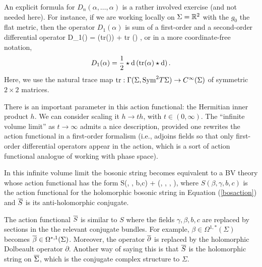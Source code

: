 An explicit formula for $D_n(\alpha,\ldots,\alpha)$ is a rather involved exercise (and not needed here).
For instance, if we are working locally on $\Sigma = \RR^2$ with the $g_0$ the flat metric, 
then the operator $D_1(\alpha)$ is sum of a first-order and a second-order differential operator
\ben
D_1(\alpha) =   ({\rm tr}(\alpha))  +  {\rm tr} (\alpha)  , 
\een
or in a more coordinate-free notation, 
\[
D_1(\alpha) = \frac{1}{2} \star \d \left({\rm tr}(\alpha) \star \d\right).
\] 
Here, we use the natural trace map ${\rm tr} : \Gamma(\Sigma , \Sym^2 T\Sigma) \to C^\infty(\Sigma)$ of symmetric $2\times2$ matrices. 

There is an important parameter in this action functional: the Hermitian inner product $h$.
We can consider scaling it $h \to t h$, with $t \in (0,\infty)$.
The ``infinite volume limit'' as $t \to \infty$ admits a nice description,
provided one rewrites the action functional in a first-order formalism
(i.e., adjoins fields so that only first-order differential operators appear in the action,
which is a sort of action functional analogue of working with phase space).

\begin{lem} 
In this infinite volume limit
the bosonic string becomes equivalent to a BV theory whose action functional has the form
\ben
S(\beta, \gamma, b,c) + (\Bar{\beta}, \Bar{\gamma}, , ),
\een
where $S(\beta, \gamma, b,c)$ is the action functional for the holomorphic bosonic string in Equation (\ref{bosaction}) and $\Bar{S}$ is its anti-holomorphic conjugate. 
\end{lem}

\begin{rmk} 
The action functional $\Bar{S}$ is similar to $S$ where the fields $\gamma,\beta,b,c$ are replaced by sections in the the relevant conjugate bundles. 
For example, $\beta \in \Omega^{1,*}(\Sigma)$ becomes $\Bar{\beta} \in \Omega^{*,1} (\Sigma)$. 
Moreover, the operator $\dbar$ is replaced by the holomorphic Dolbeault operator $\partial$. 
Another way of saying this is that $\Bar{S}$ is the holomorphic string on $\Bar{\Sigma}$, which is the conjugate complex structure to $\Sigma$. 
\end{rmk}

